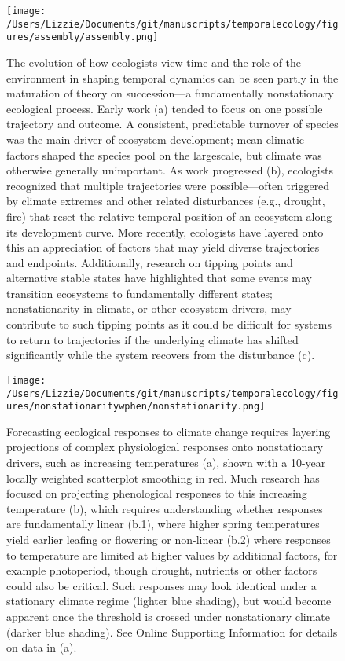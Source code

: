 \documentclass[11pt,a4paper,oneside]{article}
\begin{document}
\newpage
\begin{figure}[h!]
\centering
\noindent \texttt{[image: /Users/Lizzie/Documents/git/manuscripts/temporalecology/figures/assembly/assembly.png]}
\caption{The evolution of how ecologists view time and the role of the environment in shaping temporal dynamics can be seen partly in the maturation of theory on succession---a fundamentally nonstationary ecological process. Early work (a) tended to focus on one possible trajectory and outcome. A consistent, predictable turnover of species was the main driver of ecosystem development; mean climatic factors shaped the species pool on the largescale, but climate was otherwise generally unimportant. As work progressed (b), ecologists recognized that multiple trajectories were possible---often triggered by climate extremes and other related disturbances (e.g., drought, fire) that reset the relative temporal position of an ecosystem along its development curve. More recently, ecologists have layered onto this an appreciation of factors that may yield diverse trajectories and endpoints. Additionally, research on tipping points and alternative stable states have highlighted that some events may transition ecosystems to fundamentally different states; nonstationarity in climate, or other ecosystem drivers, may contribute to such tipping points as it could be difficult for systems to return to trajectories if the underlying climate has shifted significantly while the system recovers from the disturbance (c).}
\end{figure}

\newpage
\begin{figure}[h!]
\centering
\noindent \texttt{[image: /Users/Lizzie/Documents/git/manuscripts/temporalecology/figures/nonstationaritywphen/nonstationarity.png]}
\caption{Forecasting ecological responses to climate change requires layering projections of complex physiological responses onto nonstationary drivers, such as increasing temperatures (a), shown with a 10-year locally weighted scatterplot smoothing in red. Much research has focused on projecting phenological responses to this increasing temperature (b), which requires understanding whether responses are fundamentally linear (b.1), where higher spring temperatures yield earlier leafing or flowering or non-linear (b.2) where responses to temperature are limited at higher values by additional factors, for example photoperiod, though drought, nutrients or other factors could also be critical. Such responses may look identical under a stationary climate regime (lighter blue shading), but would become apparent once the threshold is crossed under nonstationary climate (darker blue shading). See Online Supporting Information for details on data in (a).}
\end{figure}
\end{document}
